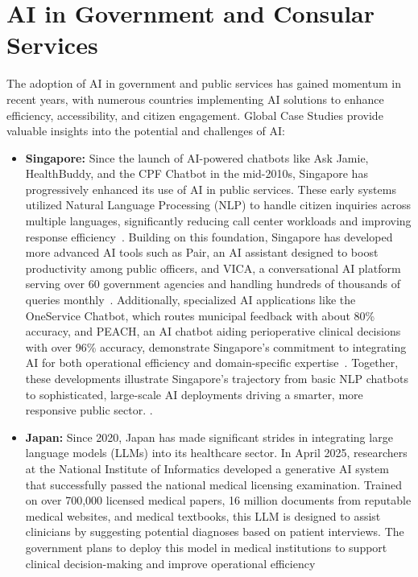 \documentclass[12pt]{report}
\begin{document}
\section{AI in Government and Consular Services}

The adoption of AI in government and public services has gained momentum in recent years, with numerous countries implementing AI solutions to enhance efficiency, accessibility, and citizen engagement. 
Global Case Studies provide valuable insights into the potential and challenges of AI:
\begin{itemize}
    \item \textbf{Singapore:} Since the launch of AI-powered chatbots like Ask Jamie, HealthBuddy, and the CPF Chatbot in the mid-2010s, Singapore has progressively enhanced its use of AI in public services. These early systems utilized Natural Language Processing (NLP) to handle citizen inquiries across multiple languages, significantly reducing call center workloads and improving response efficiency~\cite{govtech2016askjamie}. Building on this foundation, Singapore has developed more advanced AI tools such as Pair, an AI assistant designed to boost productivity among public officers, and VICA, a conversational AI platform serving over 60 government agencies and handling hundreds of thousands of queries monthly~\cite{govtech2025pair}. Additionally, specialized AI applications like the OneService Chatbot, which routes municipal feedback with about 80\% accuracy, and PEACH, an AI chatbot aiding perioperative clinical decisions with over 96\% accuracy, demonstrate Singapore's commitment to integrating AI for both operational efficiency and domain-specific expertise~\cite{chong2024peach}. Together, these developments illustrate Singapore's trajectory from basic NLP chatbots to sophisticated, large-scale AI deployments driving a smarter, more responsive public sector. \cite{govsgvica2025}.
    \item \textbf{Japan:} Since 2020, Japan has made significant strides in integrating large language models (LLMs) into its healthcare sector. In April 2025, researchers at the National Institute of Informatics developed a generative AI system that successfully passed the national medical licensing examination. Trained on over 700,000 licensed medical papers, 16 million documents from reputable medical websites, and medical textbooks, this LLM is designed to assist clinicians by suggesting potential diagnoses based on patient interviews. The government plans to deploy this model in medical institutions to support clinical decision-making and improve operational efficiency~\cite{nii2025ai,crds2024rwd}
\end{itemize}
\end{document}
